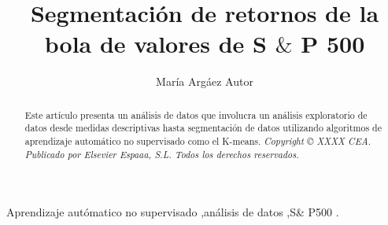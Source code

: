 \documentclass[5p,times,authoryear]{elsarticle}
\begin{document}
\begin{frontmatter}






\title{Segmentaci\'on de retornos de la bola de valores de S $\&$ P 500}



\author[First]{Mar\'ia Arg\'aez Autor}

 



\address[First]{Pedro de Alba S/N, Ni\~{n}os H\'eroes, Ciudad Universitaria, San Nicol\'as de los Garza, N.L. }
 

\begin{abstract}
Este art\'iculo presenta un an\'alisis de datos que involucra un an\'alisis exploratorio de datos desde medidas descriptivas hasta segmentaci\'on de datos utilizando algoritmos de aprendizaje autom\'atico no supervisado como el K-means.  \emph{Copyright {\copyright} XXXX CEA. Publicado por Elsevier Espaaa, S.L. Todos los derechos reservados.}
\end{abstract}

\begin{keyword}

Aprendizaje aut\'omatico no supervisado \sep an\'alisis de datos  \sep S\& P500    .

\end{keyword}

\end{frontmatter}
\end{document}

